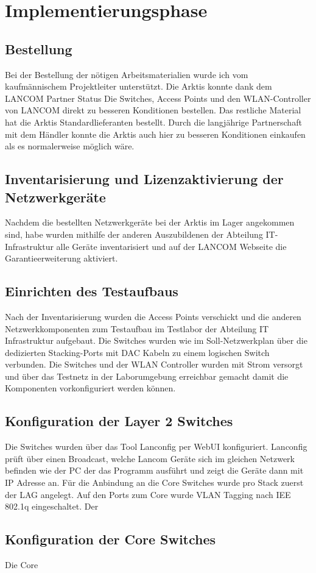 \section{Implementierungsphase} 
\label{sec:Implementierungsphase}
\subsection{Bestellung}
\label{sec:Bestellung}
Bei der Bestellung der nötigen Arbeitsmaterialien wurde ich vom kaufmännischem Projektleiter unterstützt. Die \ac{Arktis} konnte dank dem LANCOM Partner Status Die Switches, Access Points und den WLAN-Controller von LANCOM direkt zu besseren Konditionen bestellen. Das restliche Material hat die \ac{Arktis} Standardlieferanten bestellt. Durch die langjährige Partnerschaft mit dem Händler konnte die Arktis auch hier zu besseren Konditionen einkaufen als es normalerweise möglich wäre.
\subsection{Inventarisierung und Lizenzaktivierung der Netzwerkgeräte}
\label{Inventarisierung und Lizenzaktivierung der Netzwerkgeräte}
Nachdem die bestellten Netzwerkgeräte bei der \ac{Arktis} im Lager angekommen sind, habe wurden mithilfe der anderen Auszubildenen der Abteilung IT-Infrastruktur alle Geräte inventarisiert und auf der LANCOM Webseite die Garantieerweiterung aktiviert. 

\subsection{Einrichten des Testaufbaus}
\label{sec:Einrichten des Testaufbaus}
Nach der Inventarisierung wurden die Access Points verschickt und die anderen Netzwerkkomponenten zum Testaufbau im Testlabor der Abteilung IT Infrastruktur aufgebaut. Die Switches wurden wie im Soll-Netzwerkplan über die dedizierten Stacking-Ports mit \ac{DAC} Kabeln zu einem logischen Switch verbunden. Die Switches und der WLAN Controller wurden mit Strom versorgt und über das Testnetz in der Laborumgebung erreichbar gemacht damit die Komponenten vorkonfiguriert werden können.


\subsection{Konfiguration der Layer 2 Switches}
\label{sec:Konfiguration der Layer 2 Switche}
Die Switches wurden über das Tool Lanconfig per WebUI konfiguriert. Lanconfig prüft über einen Broadcast, welche Lancom Geräte sich im gleichen Netzwerk befinden wie der PC der das Programm ausführt und zeigt die Geräte dann mit IP Adresse an. Für die Anbindung an die Core Switches wurde pro Stack zuerst der \ac{LAG} angelegt. Auf den Ports zum Core wurde VLAN Tagging nach IEE 802.1q eingeschaltet. Der  

\subsection{Konfiguration der Core Switches}
\label{sec:Konfiguration der Core Switches}
Die Core 







